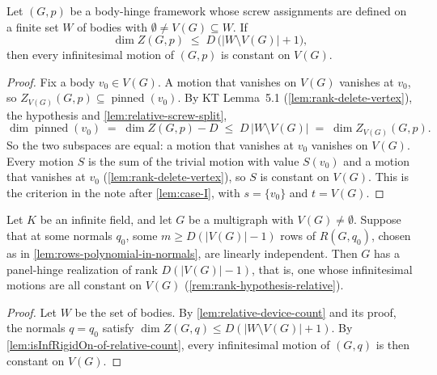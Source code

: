 \begin{lemma}
  \label{lem:isInfRigidOn-of-relative-count}
  \leanok
  Let $(G,p)$ be a body-hinge framework whose screw assignments are
  defined on a finite set $W$ of bodies with
  $\emptyset \neq V(G) \subseteq W$. If
  \[
    \dim Z(G,p) \;\le\; D\,\bigl(|W \setminus V(G)| + 1\bigr),
  \]
  then every infinitesimal motion of $(G,p)$ is constant on $V(G)$.
\end{lemma}
\begin{proof}
  \leanok
  Fix a body $v_0 \in V(G)$. A motion that vanishes on $V(G)$ vanishes at
  $v_0$, so $Z_{V(G)}(G,p) \subseteq \operatorname{pinned}(v_0)$. By KT
  Lemma~5.1 (\cref{lem:rank-delete-vertex}), the hypothesis and
  \cref{lem:relative-screw-split},
  \[
    \dim \operatorname{pinned}(v_0) \;=\; \dim Z(G,p) - D \;\le\;
    D\,|W \setminus V(G)| \;=\; \dim Z_{V(G)}(G,p).
  \]
  So the two subspaces are equal: a motion that vanishes at $v_0$
  vanishes on $V(G)$. Every motion $S$ is the sum of the trivial motion
  with value $S(v_0)$ and a motion that vanishes at $v_0$
  (\cref{lem:rank-delete-vertex}), so $S$ is constant on $V(G)$. This is
  the criterion in the note after \cref{lem:case-I}, with $s = \{v_0\}$
  and $t = V(G)$.
\end{proof}

\begin{lemma}
  \label{lem:realization-of-independent-rows}
  \leanok
  Let $K$ be an infinite field, and let $G$ be a multigraph with
  $V(G) \neq \emptyset$. Suppose that at some normals $q_0$, some
  $m \ge D(|V(G)| - 1)$ rows of $R(G,q_0)$, chosen as in
  \cref{lem:rows-polynomial-in-normals}, are linearly independent. Then
  $G$ has a panel-hinge realization of rank $D(|V(G)| - 1)$, that is, one
  whose infinitesimal motions are all constant on $V(G)$
  (\cref{rem:rank-hypothesis-relative}).
\end{lemma}
\begin{proof}
  \leanok
  Let $W$ be the set of bodies. By \cref{lem:relative-device-count} and
  its proof, the normals $q = q_0$ satisfy
  $\dim Z(G,q) \le D(|W \setminus V(G)| + 1)$. By
  \cref{lem:isInfRigidOn-of-relative-count}, every infinitesimal motion
  of $(G,q)$ is then constant on $V(G)$.
\end{proof}

